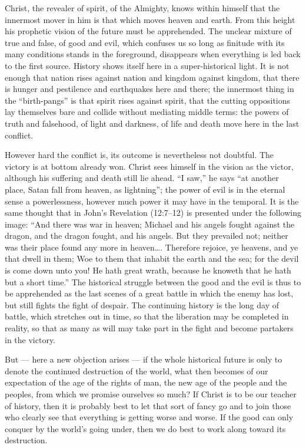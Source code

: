 \documentclass[12pt,a4paper,openany]{book}
\newcommand{\opage}[1]{\marginnote{\footnotesize\textit{[#1]}}}
\begin{document}
Christ, the revealer of spirit, of the Almighty,
knows within himself that the innermost mover in him
is that which moves heaven and earth. From this
height his prophetic vision of the future must be apprehended.
\setcounter{footnote}{0}%
\opage{40}The unclear mixture of true and false, of good and
evil, which confuses us so long as finitude with its
many conditions stands in the foreground, disappears when
everything is led back to the first source. History
shows itself here in a super-historical light. It is not enough that
nation rises against nation and kingdom against kingdom, that there
is hunger and pestilence and earthquakes here and there;
the innermost thing in the ``birth-pangs'' is that spirit rises against
spirit, that the cutting oppositions lay themselves bare and collide
without mediating middle terms: the powers of truth and
falsehood, of light and darkness, of life and death
move here in the last conflict.

However hard the conflict is, its outcome is
nevertheless not doubtful. The victory is at bottom already
won. Christ sees himself in the vision as the victor,
although his suffering and death still lie ahead. ``I
saw,'' he says ``at another place, Satan fall
from heaven, as lightning''; the power of evil is in the eternal sense
a powerlessness, however much power it may have in
the temporal. It is the same thought that in John's
Revelation (12:7--12) is presented under the following
image: ``And there was war in heaven; Michael and
his angels fought against the dragon, and the dragon fought, and
his angels. But they prevailed not; neither was
their place found any more in heaven\dots{}. Therefore
rejoice, ye heavens, and ye that dwell in them; Woe to them
that inhabit the earth and the sea; for the devil is come down
unto you! He hath great wrath, because he knoweth that
he hath but a short time.'' The historical struggle between
the good and the evil is thus to be apprehended as the
last scenes of a great battle in which the enemy has lost,
but still fights the fight of despair. The
\setcounter{footnote}{0}%
\opage{41}continuing history is the long day of battle, which stretches
out in time, so that the liberation may be completed in reality,
so that as many as will may take part in the fight
and become partakers in the victory.

But --- here a new objection arises --- if
the whole historical future is only to denote the continued
destruction of the world, what then becomes of our expectation
of the age of the rights of man, the new
age of the people and the peoples, from which we promise ourselves so much?
If Christ is to be our teacher of history, then it is probably
best to let that sort of fancy go and to join
those who clearly see that everything is getting worse and worse.
If the good can only conquer by the world's going under,
then we do best to work along toward its destruction.
\end{document}
